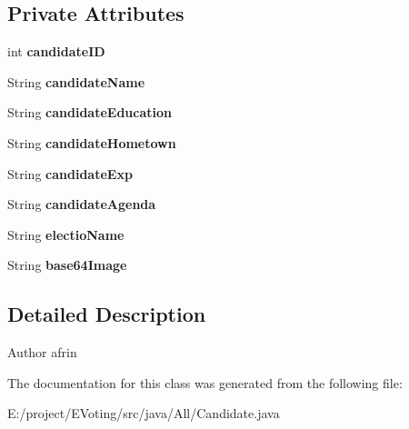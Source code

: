\subsection*{Private Attributes}
\begin{DoxyCompactItemize}
\item 
\mbox{\label{class_models_1_1_candidate_a03298d3f6a3ac1dc5a754ab0cee91cf9}} 
int {\bfseries candidate\+ID}
\item 
\mbox{\label{class_models_1_1_candidate_a0ae97cc7a14c2c531aa91bd4f6602e95}} 
String {\bfseries candidate\+Name}
\item 
\mbox{\label{class_models_1_1_candidate_af0a48980b88319a41f80e01074e7223b}} 
String {\bfseries candidate\+Education}
\item 
\mbox{\label{class_models_1_1_candidate_a9f5c8aeaef7740755b6d287358b781e3}} 
String {\bfseries candidate\+Hometown}
\item 
\mbox{\label{class_models_1_1_candidate_a753fc34eb3ffd7c685dfbfa007b79877}} 
String {\bfseries candidate\+Exp}
\item 
\mbox{\label{class_models_1_1_candidate_a800df980eb8f4a0815ca4419199f3455}} 
String {\bfseries candidate\+Agenda}
\item 
\mbox{\label{class_models_1_1_candidate_ae6ea3b096c1b7898276b0e5d9ccde4cd}} 
String {\bfseries electio\+Name}
\item 
\mbox{\label{class_models_1_1_candidate_a6a4fd9688871e57e0b3de8c17f9ed7c7}} 
String {\bfseries base64\+Image}
\end{DoxyCompactItemize}


\subsection{Detailed Description}
\begin{DoxyAuthor}{Author}
afrin 
\end{DoxyAuthor}


The documentation for this class was generated from the following file\+:\begin{DoxyCompactItemize}
\item 
E\+:/project/\+E\+Voting/src/java/\+All/Candidate.\+java\end{DoxyCompactItemize}
